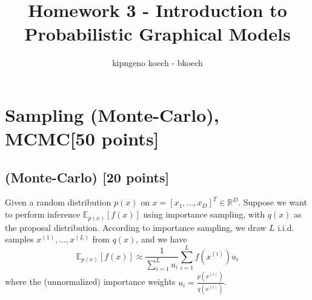\documentclass{article}
\author{kipngeno koech - bkoech}
\title{Homework 3 - Introduction to Probabilistic Graphical Models}
\date{}
\begin{document}
\maketitle

\section{Sampling (Monte-Carlo), MCMC[50 points]}

\subsection{(Monte-Carlo) [20 points]}

Given a random distribution $p(x)$ on $x = [x_1, ..., x_D]^T \in \mathbb{R}^D$. Suppose we want to perform inference
$\mathbb{E}_{p(x)}[f(x)]$ using importance sampling, with $q(x)$ as the proposal distribution. According to importance
sampling, we draw $L$ i.i.d. samples $x^{(1)}, ..., x^{(L)}$ from $q(x)$, and we have
$$\mathbb{E}_{p(x)}[f(x)] \approx \frac{1}{\sum_{i=1}^L u_i} \sum_{i=1}^L f(x^{(i)})u_i$$
where the (unnormalized) importance weights $u_i = \frac{p(x^{(i)})}{q(x^{(i)})}$.
\end{document}
